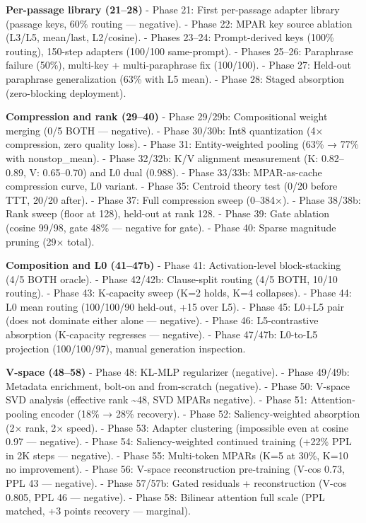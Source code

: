 \textbf{Per-passage library (21--28)} - Phase 21: First per-passage adapter library (passage keys, 60\% routing --- negative). - Phase 22: MPAR key source ablation (L3/L5, mean/last, L2/cosine). - Phases 23--24: Prompt-derived keys (100\% routing), 150-step adapters (100/100 same-prompt). - Phases 25--26: Paraphrase failure (50\%), multi-key + multi-paraphrase fix (100/100). - Phase 27: Held-out paraphrase generalization (63\% with L5 mean). - Phase 28: Staged absorption (zero-blocking deployment).

\textbf{Compression and rank (29--40)} - Phase 29/29b: Compositional weight merging (0/5 BOTH --- negative). - Phase 30/30b: Int8 quantization (4× compression, zero quality loss). - Phase 31: Entity-weighted pooling (63\% → 77\% with nonstop\_mean). - Phase 32/32b: K/V alignment measurement (K: 0.82--0.89, V: 0.65--0.70) and L0 dual (0.988). - Phase 33/33b: MPAR-as-cache compression curve, L0 variant. - Phase 35: Centroid theory test (0/20 before TTT, 20/20 after). - Phase 37: Full compression sweep (0--384×). - Phase 38/38b: Rank sweep (floor at 128), held-out at rank 128. - Phase 39: Gate ablation (cosine 99/98, gate 48\% --- negative for gate). - Phase 40: Sparse magnitude pruning (29× total).

\textbf{Composition and L0 (41--47b)} - Phase 41: Activation-level block-stacking (4/5 BOTH oracle). - Phase 42/42b: Clause-split routing (4/5 BOTH, 10/10 routing). - Phase 43: K-capacity sweep (K=2 holds, K=4 collapses). - Phase 44: L0 mean routing (100/100/90 held-out, +15 over L5). - Phase 45: L0+L5 pair (does not dominate either alone --- negative). - Phase 46: L5-contrastive absorption (K-capacity regresses --- negative). - Phase 47/47b: L0-to-L5 projection (100/100/97), manual generation inspection.

\textbf{V-space (48--58)} - Phase 48: KL-MLP regularizer (negative). - Phase 49/49b: Metadata enrichment, bolt-on and from-scratch (negative). - Phase 50: V-space SVD analysis (effective rank \textasciitilde48, SVD MPARs negative). - Phase 51: Attention-pooling encoder (18\% → 28\% recovery). - Phase 52: Saliency-weighted absorption (2× rank, 2× speed). - Phase 53: Adapter clustering (impossible even at cosine 0.97 --- negative). - Phase 54: Saliency-weighted continued training (+22\% PPL in 2K steps --- negative). - Phase 55: Multi-token MPARs (K=5 at 30\%, K=10 no improvement). - Phase 56: V-space reconstruction pre-training (V-cos 0.73, PPL 43 --- negative). - Phase 57/57b: Gated residuals + reconstruction (V-cos 0.805, PPL 46 --- negative). - Phase 58: Bilinear attention full scale (PPL matched, +3 points recovery --- marginal).

